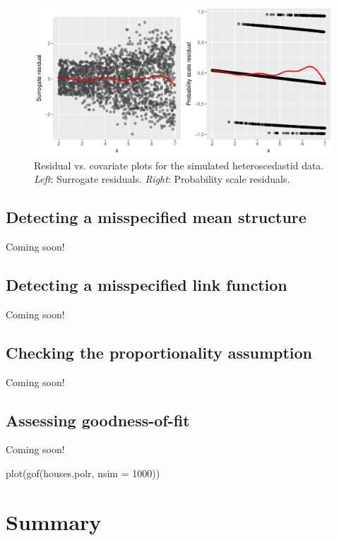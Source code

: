 \begin{figure}
  \centering
  \includegraphics[width=1\textwidth]{heteroscedasticity}
  \caption{Residual vs. covariate plots for the simulated heteroscedastid data. \textit{Left}: Surrogate residuals. \textit{Right}: Probability scale residuals.}
  \label{fig:heteroscedasticity}
\end{figure}

\subsection{Detecting a misspecified mean structure}

Coming soon!


\subsection{Detecting a misspecified link function}

Coming soon!


\subsection{Checking the proportionality assumption}

Coming soon!


\subsection{Assessing goodness-of-fit}

Coming soon!

\begin{example}
  plot(gof(houses.polr, nsim = 1000))
\end{example}


\section{Summary}

